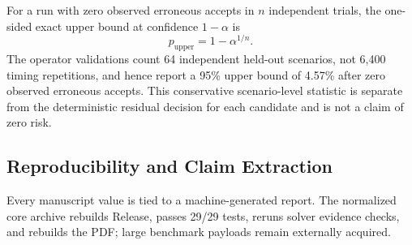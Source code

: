 For a run with zero observed erroneous accepts in $n$ independent trials, the
one-sided exact upper bound at confidence $1-\alpha$ is
\begin{equation}
 p_{\mathrm{upper}}=1-\alpha^{1/n}.
\end{equation}
The operator validations count 64 independent held-out scenarios, not 6,400 timing
repetitions, and hence report a 95\% upper bound of 4.57\% after zero observed
erroneous accepts. This conservative scenario-level statistic is separate from the
deterministic residual decision for each candidate and is not a claim of zero risk.

\subsection{Reproducibility and Claim Extraction}

Every manuscript value is tied to a machine-generated report. The normalized core
archive rebuilds Release, passes 29/29 tests, reruns solver evidence checks, and
rebuilds the PDF; large benchmark payloads remain externally acquired.
